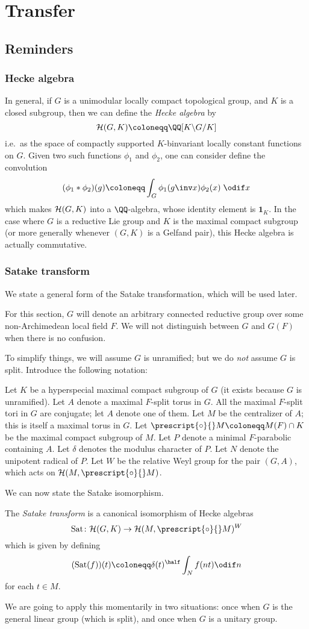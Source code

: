 \chapter{Transfer}
\section{Reminders}
\subsection{Hecke algebra}
In general, if $G$ is a unimodular locally compact topological group,
and $K$ is a closed subgroup, then we can define the \emph{Hecke algebra} by
\[ \HH(G, K) \coloneqq \QQ[K \backslash G \slash K] \]
i.e.\ as the space of compactly supported $K$-binvariant locally constant functions on $G$.
Given two such functions $\phi_1$ and $\phi_2$, one can consider define the convolution
\[ (\phi_1 \ast \phi_2)(g) \coloneqq \int_G \phi_1(g\inv x) \phi_2(x) \; \odif x \]
which makes $\mathcal H(G, K)$ into a $\QQ$-algebra,
whose identity element is $\mathbf{1}_K$.
In the case where $G$ is a reductive Lie group and
$K$ is the maximal compact subgroup
(or more generally whenever $(G,K)$ is a Gelfand pair),
this Hecke algebra is actually commutative.
\subsection{Satake transform}
We state a general form of the Satake transformation, which will be used later.

For this section, $G$ will denote an arbitrary connected reductive group
over some non-Archimedean local field $F$.
We will not distinguish between $G$ and $G(F)$ when there is no confusion.

To simplify things, we will assume $G$ is unramified;
but we do \emph{not} assume $G$ is split.
Introduce the following notation:
\begin{itemize}
  \ii Let $K$ be a hyperspecial maximal compact subgroup of $G$
  (it exists because $G$ is unramified).
  \ii Let $A$ denote a maximal $F$-split torus in $G$.
  All the maximal $F$-split tori in $G$ are conjugate; let $A$ denote one of them.
  \ii Let $M$ be the centralizer of $A$; this is itself a maximal torus in $G$.
  \ii Let $\prescript{\circ}{} M \coloneqq M(F) \cap K$
  be the maximal compact subgroup of $M$.
  \ii Let $P$ denote a minimal $F$-parabolic containing $A$.
  \ii Let $\delta$ denotes the modulus character of $P$.
  \ii Let $N$ denote the unipotent radical of $P$.
  \ii Let $W$ be the relative Weyl group for the pair $(G,A)$,
  which acts on $\HH(M, \prescript{\circ}{} M)$.
\end{itemize}
We can now state the Satake isomorphism.
\begin{definition}
  The \emph{Satake transform} is a canonical isomorphism of Hecke algebras
  \[ \Sat \colon \HH(G, K) \to \HH(M, \prescript{\circ}{} M)^W \]
  which is given by defining
  \[ (\Sat(f))(t) \coloneqq \delta(t)^\half \int_N f(nt) \odif n  \]
  for each $t \in M$.
\end{definition}
We are going to apply this momentarily in two situations:
once when $G$ is the general linear group (which is split),
and once when $G$ is a unitary group.

